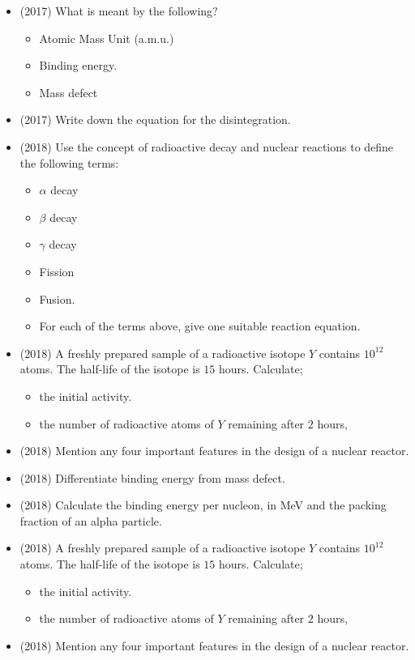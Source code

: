 \documentclass{article}
\begin{document}
\begin{itemize}
\item (2017)  What is meant by the following?
 \begin{itemize}
\item Atomic Mass Unit (a.m.u.)
\item Binding energy. 
\item Mass defect
\end{itemize}
\item (2017)  Write down the equation for the disintegration.
\item (2018)  Use the concept of radioactive decay and nuclear reactions to define the following terms:
 \begin{itemize}
\item $ \alpha $ decay
\item $ \beta$ decay
\item $ \gamma $ decay
\item Fission
\item Fusion.
\item For each of the terms above, give one suitable reaction equation. 
\end{itemize}
\item (2018)  A freshly prepared sample of a radioactive isotope $ Y$ contains $ 10^{12}$ atoms. The half-life of the isotope is $ 15$ hours. Calculate;
 \begin{itemize}
\item the initial activity. 
\item the number of radioactive atoms of $ Y$ remaining after $ 2$ hours, 
\end{itemize}
\item (2018)  Mention any four important features in the design of a nuclear reactor.
\item (2018)  Differentiate binding energy from mass defect.
\item (2018)  Calculate the binding energy per nucleon, in MeV and the packing fraction of an alpha particle.
\item (2018)  A freshly prepared sample of a radioactive isotope $ Y$ contains $ 10^{12}$ atoms. The half-life of the isotope is $ 15$ hours. Calculate;
 \begin{itemize}
\item the initial activity. 
\item the number of radioactive atoms of $ Y$ remaining after $ 2$ hours, 
\end{itemize}
\item (2018)  Mention any four important features in the design of a nuclear reactor.

\end{itemize}
\end{document}
